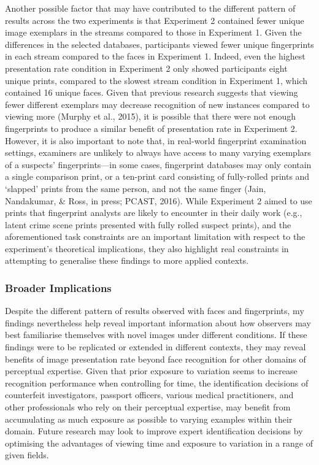 \documentclass[
  english,
  man]{apa6}
\begin{document}
Another possible factor that may have contributed to the different pattern of results across the two experiments is that Experiment 2 contained fewer unique image exemplars in the streams compared to those in Experiment 1. Given the differences in the selected databases, participants viewed fewer unique fingerprints in each stream compared to the faces in Experiment 1. Indeed, even the highest presentation rate condition in Experiment 2 only showed participants eight unique prints, compared to the slowest stream condition in Experiment 1, which contained 16 unique faces. Given that previous research suggests that viewing fewer different exemplars may decrease recognition of new instances compared to viewing more (Murphy et al., 2015), it is possible that there were not enough fingerprints to produce a similar benefit of presentation rate in Experiment 2. However, it is also important to note that, in real-world fingerprint examination settings, examiners are unlikely to always have access to many varying exemplars of a suspects' fingerprints---in some cases, fingerprint databases may only contain a single comparison print, or a ten-print card consisting of fully-rolled prints and `slapped' prints from the same person, and not the same finger (Jain, Nandakumar, \& Ross, in press; PCAST, 2016). While Experiment 2 aimed to use prints that fingerprint analysts are likely to encounter in their daily work (e.g., latent crime scene prints presented with fully rolled suspect prints), and the aforementioned task constraints are an important limitation with respect to the experiment's theoretical implications, they also highlight real constraints in attempting to generalise these findings to more applied contexts.

\hypertarget{broader-implications}{%
\subsubsection{Broader Implications}\label{broader-implications}}

Despite the different pattern of results observed with faces and fingerprints, my findings nevertheless help reveal important information about how observers may best familiarise themselves with novel images under different conditions. If these findings were to be replicated or extended in different contexts, they may reveal benefits of image presentation rate beyond face recognition for other domains of perceptual expertise. Given that prior exposure to variation seems to increase recognition performance when controlling for time, the identification decisions of counterfeit investigators, passport officers, various medical practitioners, and other professionals who rely on their perceptual expertise, may benefit from accumulating as much exposure as possible to varying examples within their domain. Future research may look to improve expert identification decisions by optimising the advantages of viewing time and exposure to variation in a range of given fields.
\end{document}
